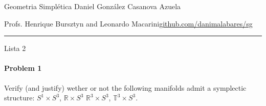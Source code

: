 

\usepackage[style=authortitle-terse,backend=bibtex]{biblatex}




\begin{minipage}{\textwidth}
	\begin{minipage}{1\textwidth}
		Geometria Simpl\'etica \hfill Daniel González Casanova Azuela
		
		{\small Profs. Henrique Bursztyn and Leonardo Macarini\hfill\href{https://github.com/danimalabares/sg}{github.com/danimalabares/sg}}
	\end{minipage}
\end{minipage}\vspace{.2cm}\hrule

\vspace{10pt}
{\huge Lista 2}

\tableofcontents

\paragraph{Problem 1} Verify (and justify) wether or not the following manifolds admit a symplectic structure: $S^{1}\times S^3$, $\mathbb{R}\times S^3$ $\mathbb{R}^{3}\times S^{3}$, $\mathbb{T}^3\times S^3$.

